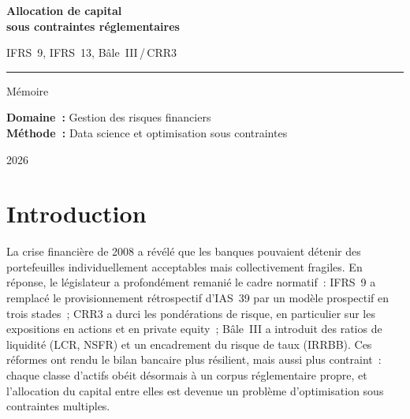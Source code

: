 \documentclass[12pt, a4paper, twoside, openright]{report}
\theoremstyle{definition}
\begin{document}
\begin{titlepage}
\centering
\vspace*{3cm}

{\Huge\bfseries Allocation de capital\\[0.4em]
sous contraintes réglementaires}

\vspace{1.5cm}

{\LARGE IFRS~9, IFRS~13, Bâle~III\,/\,CRR3}

\vspace{3cm}

\rule{0.5\textwidth}{0.5pt}

\vspace{2cm}

{\Large Mémoire}

\vspace{1.5cm}

{\large
\textbf{Domaine~:} Gestion des risques financiers\\[0.5em]
\textbf{Méthode~:} Data science et optimisation sous contraintes
}

\vfill

{\large 2026}

\end{titlepage}

\tableofcontents
\newpage


\chapter*{Introduction}
\label{chap:introduction}


La crise financière de 2008 a révélé que les banques pouvaient détenir des portefeuilles individuellement acceptables mais collectivement fragiles.
En réponse, le législateur a profondément remanié le cadre normatif~: IFRS~9 \citep{ifrs9} a remplacé le provisionnement rétrospectif d'IAS~39 par un modèle prospectif en trois stades~; CRR3 \citep{crr3} a durci les pondérations de risque, en particulier sur les expositions en actions et en private equity~; Bâle~III \citep{bcbs_d424} a introduit des ratios de liquidité (LCR, NSFR) et un encadrement du risque de taux (IRRBB).
Ces réformes ont rendu le bilan bancaire plus résilient, mais aussi plus contraint~: chaque classe d'actifs obéit désormais à un corpus réglementaire propre, et l'allocation du capital entre elles est devenue un problème d'optimisation sous contraintes multiples.
\end{document}
